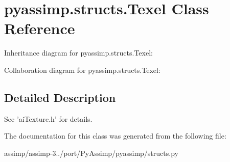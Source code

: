 \hypertarget{classpyassimp_1_1structs_1_1_texel}{\section{pyassimp.\+structs.\+Texel Class Reference}
\label{classpyassimp_1_1structs_1_1_texel}
}


Inheritance diagram for pyassimp.\+structs.\+Texel\+:


Collaboration diagram for pyassimp.\+structs.\+Texel\+:


\subsection{Detailed Description}
\begin{DoxyVerb}See 'aiTexture.h' for details.
\end{DoxyVerb}
 

The documentation for this class was generated from the following file\+:\begin{DoxyCompactItemize}
\item 
assimp/assimp-\/3../port/\+Py\+Assimp/pyassimp/structs.\+py\end{DoxyCompactItemize}

